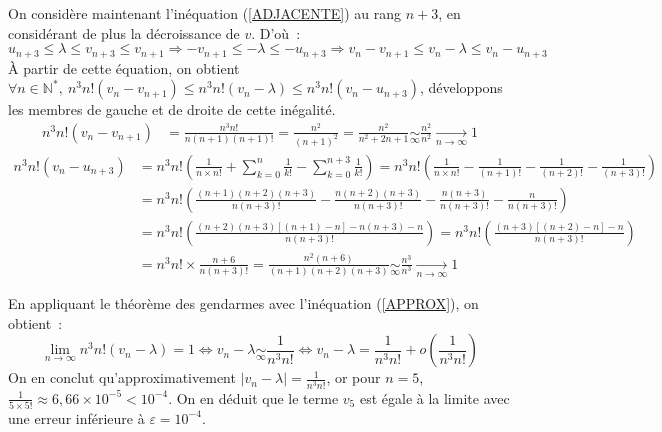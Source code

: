 \documentclass{article}
\begin{document}
  On considère maintenant l'inéquation (\ref{ADJACENTE}) au rang $n + 3$, en considérant de plus la décroissance de $v$. D'où~:
  \begin{equation}\label{APPROX}
    u_{n + 3} \leqslant \lambda \leqslant v_{n + 3} \leqslant v_{n + 1} \Longrightarrow -v_{n + 1} \leqslant -\lambda \leqslant -u_{n + 3} \Longrightarrow v_n - v_{n + 1} \leqslant v_n - \lambda \leqslant v_n - u_{n + 3}
  \end{equation}
  À partir de cette équation, on obtient $\forall n\in\mathbb{N}^*,\ n^3n!(v_n - v_{n + 1}) \leqslant n^3n!(v_n - \lambda) \leqslant n^3n!(v_n - u_{n + 3})$, développons les membres de gauche et de droite de cette inégalité.
  \begin{align*}
    n^3n!(v_n - v_{n + 1}) &= \frac{n^3n!}{n(n + 1)(n + 1)!} = \frac{n^2}{(n+1)^2} = \frac{n^2}{n^2 + 2n + 1} \underset{\infty}{\sim} \frac{n^2}{n^2} \underset{n\to\infty}{\longrightarrow} 1
  \end{align*}
  \begin{align*}
    n^3n!(v_n - u_{n + 3}) &= n^3n!\left(\frac{1}{n\times n!} + \sum_{k = 0}^n \frac{1}{k!} - \sum_{k = 0}^{n+3} \frac{1}{k!}\right) = n^3n!\left(\frac{1}{n\times n!} - \frac{1}{(n+1)!} - \frac{1}{(n+2)!} - \frac{1}{(n+3)!}\right) \\
    &= n^3n!\left(\frac{(n+1)(n+2)(n+3)}{n(n+3)!}-\frac{n(n+2)(n+3)}{n(n+3)!} - \frac{n(n+3)}{n(n+3)!} - \frac{n}{n(n+3)!}\right) \\
    &= n^3n!\left(\frac{(n+2)(n+3)[(n+1)-n]-n(n+3)-n}{n(n+3)!}\right) = n^3n!\left(\frac{(n+3)[(n+2)-n] - n}{n(n+3)!}\right) \\
    &= n^3n! \times \frac{n+6}{n(n+3)!} = \frac{n^2(n+6)}{(n+1)(n+2)(n+3)} \underset{\infty}{\sim} \frac{n^3}{n^3} \underset{n\to\infty}{\longrightarrow} 1
  \end{align*}

  En appliquant le théorème des gendarmes avec l'inéquation (\ref{APPROX}), on obtient~:
  \begin{displaymath}
    \lim_{n\to\infty} n^3n!(v_n - \lambda) = 1 \iff v_n - \lambda \underset{\infty}{\sim} \frac{1}{n^3n!} \iff
    v_n - \lambda = \frac{1}{n^3n!} + o\left(\frac{1}{n^3n!}\right)
  \end{displaymath}
  On en conclut qu'approximativement $|v_n - \lambda| = \frac{1}{n^3n!}$, or pour $n = 5$, $\frac{1}{5\times 5!} \approx 6,66 \times 10^{-5} < 10^{-4}$. On en déduit que le terme $v_5$ est égale à la limite avec une erreur inférieure à $\varepsilon = 10^{-4}$.
\end{document}
